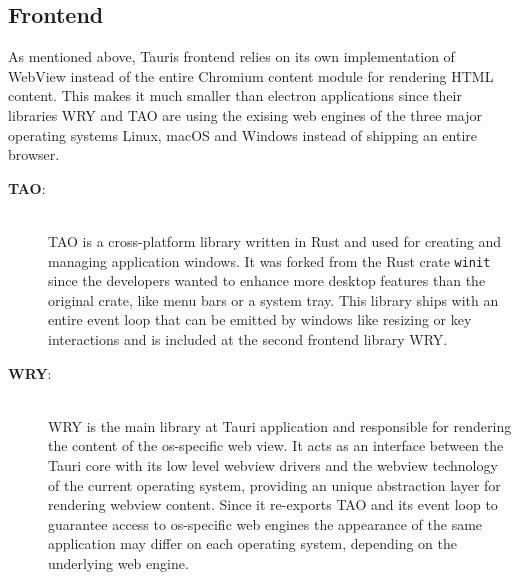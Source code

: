 \subsection{Frontend}
\label{subsec:tauri:frontend}
As mentioned above, Tauris frontend relies on its own implementation of WebView instead of the entire Chromium content module for rendering \ac{HTML} content.
This makes it much smaller than electron applications since their libraries WRY and TAO are using the exising web engines of the three major operating systems Linux, macOS and Windows instead of shipping an entire browser.
\begin{description}
    \item[\textbf{TAO}:] \hfill \\
    TAO is a cross-platform library written in Rust and used for creating and managing application windows.
    It was forked from the Rust crate \texttt{winit} since the developers wanted to enhance more desktop features than the original crate, like menu bars or a system tray.
    This library ships with an entire event loop that can be emitted by windows like resizing or key interactions and is included at the second frontend library WRY.
    \item[\textbf{WRY}:] \hfill \\
    WRY is the main library at Tauri application and responsible for rendering the content of the os-specific web view.
    It acts as an interface between the Tauri core with its low level webview drivers and the webview technology of the current operating system, providing an unique abstraction layer for rendering webview content.
    Since it re-exports TAO and its event loop to guarantee access to os-specific web engines the appearance of the same application may differ on each operating system, depending on the underlying web engine.
\end{description}
